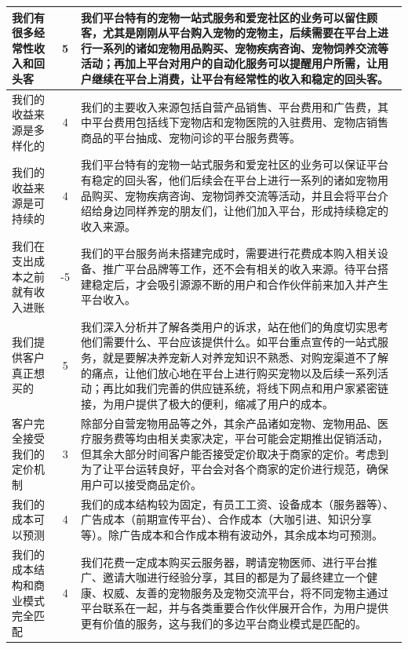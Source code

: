 \documentclass[a4paper]{ctexart}
\begin{document}
\begin{table}[h]
  \centering
\begin{tabular}{|p{3.5cm}|c|p{10cm}|}
  \hline
  我们有很多经常性收入和回头客 & 5 & 我们平台特有的宠物一站式服务和爱宠社区的业务可以留住顾客，尤其是刚刚从平台购入宠物的宠物主，后续需要在平台上进行一系列的诸如宠物用品购买、宠物疾病咨询、宠物饲养交流等活动；再加上平台对用户的自动化服务可以提醒用户所需，让用户继续在平台上消费，让平台有经常性的收入和稳定的回头客。\\
  \hline
  我们的收益来源是多样化的 & 4 & 我们的主要收入来源包括自营产品销售、平台费用和广告费，其中平台费用包括线下宠物店和宠物医院的入驻费用、宠物店销售商品的平台抽成、宠物问诊的平台服务费等。\\
  \hline
  我们的收益来源是可持续的 & 4 & 我们平台特有的宠物一站式服务和爱宠社区的业务可以保证平台有稳定的回头客，他们后续会在平台上进行一系列的诸如宠物用品购买、宠物疾病咨询、宠物饲养交流等活动，并且会将平台介绍给身边同样养宠的朋友们，让他们加入平台，形成持续稳定的收入来源。\\
  \hline
  我们在支出成本之前就有收入进账 & -5 & 我们的平台服务尚未搭建完成时，需要进行花费成本购入相关设备、推广平台品牌等工作，还不会有相关的收入来源。待平台搭建稳定后，才会吸引源源不断的用户和合作伙伴前来加入并产生平台收入。\\
  \hline
  我们提供客户真正想买的 & 5 & 我们深入分析并了解各类用户的诉求，站在他们的角度切实思考他们需要什么、平台应该提供什么。如平台重点宣传的一站式服务，就是要解决养宠新人对养宠知识不熟悉、对购宠渠道不了解的痛点，让他们放心地在平台上进行购买宠物以及后续一系列活动；再比如我们完善的供应链系统，将线下网点和用户家紧密链接，为用户提供了极大的便利，缩减了用户的成本。\\
  \hline
  客户完全接受我们的定价机制 & 3 & 除部分自营宠物用品等之外，其余产品诸如宠物、宠物用品、医疗服务费等均由相关卖家决定，平台可能会定期推出促销活动，但其余大部分时间客户能否接受定价取决于商家的定价。考虑到为了让平台运转良好，平台会对各个商家的定价进行规范，确保用户可以接受商品定价。\\
  \hline
  我们的成本可以预测 & 4 & 我们的成本结构较为固定，有员工工资、设备成本（服务器等）、广告成本（前期宣传平台）、合作成本（大咖引进、知识分享等）。除广告成本和合作成本稍有波动外，其余成本均可预测。\\
  \hline
  我们的成本结构和商业模式完全匹配 & 4 & 我们花费一定成本购买云服务器，聘请宠物医师、进行平台推广、邀请大咖进行经验分享，其目的都是为了最终建立一个健康、权威、友善的宠物服务及宠物交流平台，将不同宠物主通过平台联系在一起，并与各类重要合作伙伴展开合作，为用户提供更有价值的服务，这与我们的多边平台商业模式是匹配的。\\

\end{tabular}
\end{table}
\end{document}
